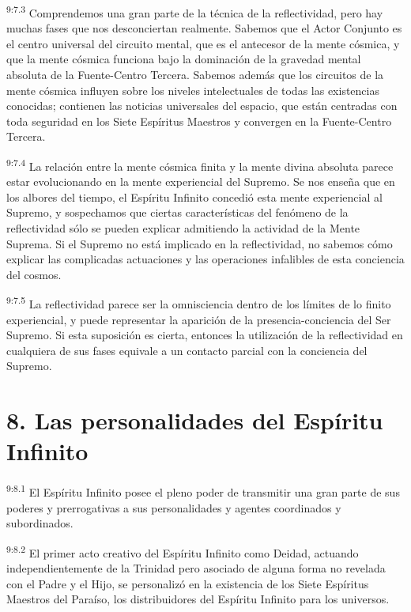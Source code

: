 \par
\textsuperscript{9:7.3} Comprendemos una gran parte de la técnica de la reflectividad, pero hay muchas fases que nos desconciertan realmente. Sabemos que el Actor Conjunto es el centro universal del circuito mental, que es el antecesor de la mente cósmica, y que la mente cósmica funciona bajo la dominación de la gravedad mental absoluta de la Fuente-Centro Tercera. Sabemos además que los circuitos de la mente cósmica influyen sobre los niveles intelectuales de todas las existencias conocidas; contienen las noticias universales del espacio, que están centradas con toda seguridad en los Siete Espíritus Maestros y convergen en la Fuente-Centro Tercera.

\par
\textsuperscript{9:7.4} La relación entre la mente cósmica finita y la mente divina absoluta parece estar evolucionando en la mente experiencial del Supremo. Se nos enseña que en los albores del tiempo, el Espíritu Infinito concedió esta mente experiencial al Supremo, y sospechamos que ciertas características del fenómeno de la reflectividad sólo se pueden explicar admitiendo la actividad de la Mente Suprema. Si el Supremo no está implicado en la reflectividad, no sabemos cómo explicar las complicadas actuaciones y las operaciones infalibles de esta conciencia del cosmos.

\par
\textsuperscript{9:7.5} La reflectividad parece ser la omnisciencia dentro de los límites de lo finito experiencial, y puede representar la aparición de la presencia-conciencia del Ser Supremo. Si esta suposición es cierta, entonces la utilización de la reflectividad en cualquiera de sus fases equivale a un contacto parcial con la conciencia del Supremo.

\section*{8. Las personalidades del Espíritu Infinito}
\par
\textsuperscript{9:8.1} El Espíritu Infinito posee el pleno poder de transmitir una gran parte de sus poderes y prerrogativas a sus personalidades y agentes coordinados y subordinados.

\par
\textsuperscript{9:8.2} El primer acto creativo del Espíritu Infinito como Deidad, actuando independientemente de la Trinidad pero asociado de alguna forma no revelada con el Padre y el Hijo, se personalizó en la existencia de los Siete Espíritus Maestros del Paraíso, los distribuidores del Espíritu Infinito para los universos.

